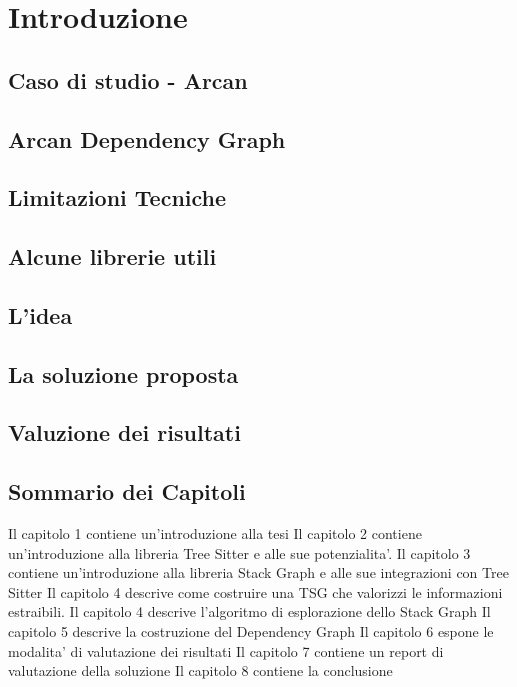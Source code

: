 \chapter{Introduzione}

\section{Caso di studio - Arcan}

\section{Arcan Dependency Graph}

\section{Limitazioni Tecniche}

\section{Alcune librerie utili}

\section{L'idea}

\section{La soluzione proposta}

\section{Valuzione dei risultati}

\section{Sommario dei Capitoli}

Il capitolo 1 contiene un'introduzione alla tesi
Il capitolo 2 contiene un'introduzione alla libreria Tree Sitter e alle sue potenzialita'.
Il capitolo 3 contiene un'introduzione alla libreria Stack Graph e alle sue integrazioni con Tree Sitter
Il capitolo 4 descrive come costruire una TSG che valorizzi le informazioni estraibili.
Il capitolo 4 descrive l'algoritmo di esplorazione dello Stack Graph
Il capitolo 5 descrive la costruzione del Dependency Graph
Il capitolo 6 espone le modalita' di valutazione dei risultati
Il capitolo 7 contiene un report di valutazione della soluzione
Il capitolo 8 contiene la conclusione
